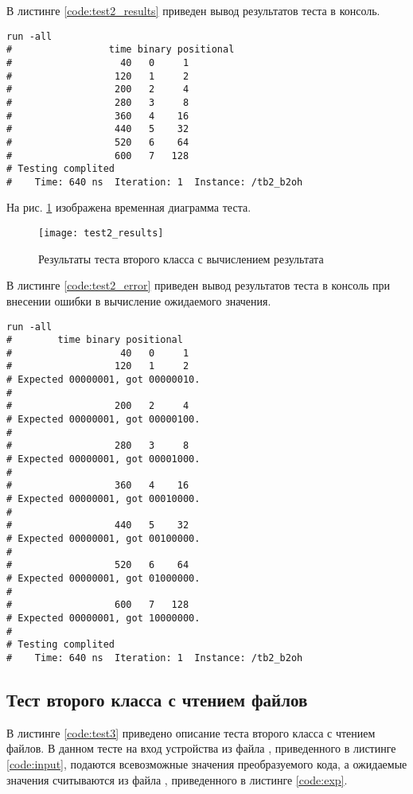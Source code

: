 В листинге \ref{code:test2_results} приведен вывод результатов теста в консоль.
\begin{lstlisting}[caption=Результаты теста второго класса с вычислением результата, label=code:test2_results, style=console]
run -all
# 		          time binary positional
#                   40   0     1
#                  120   1     2
#                  200   2     4
#                  280   3     8
#                  360   4    16
#                  440   5    32
#                  520   6    64
#                  600   7   128
# Testing complited
#    Time: 640 ns  Iteration: 1  Instance: /tb2_b2oh
\end{lstlisting}

На рис. \ref{fig:test2_results} изображена временная диаграмма теста.
\begin{figure}[H]
	\begin{center}
		\texttt{[image: test2\_results]}
		\caption{Результаты теста второго класса с вычислением результата}
		\label{fig:test2_results}
	\end{center}
\end{figure}

В листинге \ref{code:test2_error} приведен вывод результатов теста в консоль при внесении ошибки в вычисление ожидаемого значения.
\begin{lstlisting}[caption=Результаты ошибочного теста второго класса с вычислением результата, label=code:test2_error, style=console]
run -all
# 		 time binary positional
#                   40   0     1
#                  120   1     2
# Expected 00000001, got 00000010.
# 
#                  200   2     4
# Expected 00000001, got 00000100.
# 
#                  280   3     8
# Expected 00000001, got 00001000.
# 
#                  360   4    16
# Expected 00000001, got 00010000.
# 
#                  440   5    32
# Expected 00000001, got 00100000.
# 
#                  520   6    64
# Expected 00000001, got 01000000.
# 
#                  600   7   128
# Expected 00000001, got 10000000.
# 
# Testing complited
#    Time: 640 ns  Iteration: 1  Instance: /tb2_b2oh
\end{lstlisting}

\subsection{Тест второго класса с чтением файлов}

В листинге \ref{code:test3} приведено описание теста второго класса с чтением файлов. В данном тесте на вход устройства из файла , приведенного в листинге \ref{code:input}, подаются всевозможные значения преобразуемого кода, а ожидаемые значения считываются из файла , приведенного в листинге \ref{code:exp}. 


